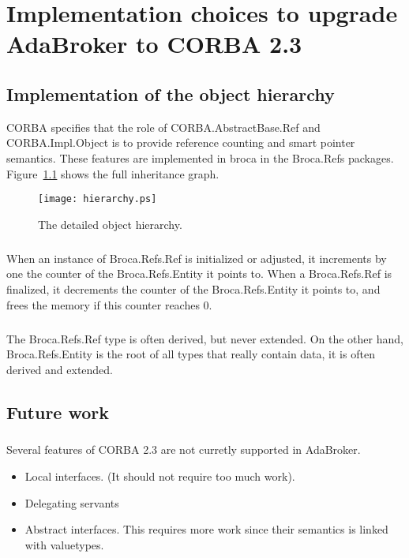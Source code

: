\chapter{Implementation choices to upgrade AdaBroker to CORBA 2.3}

\section{Implementation of the object hierarchy}
CORBA specifies that the role of CORBA.AbstractBase.Ref and
CORBA.Impl.Object is to provide reference counting and smart pointer
semantics. These features are implemented in broca in the Broca.Refs
packages. Figure~\ref{fig::detailed_hierarchy} shows the
full inheritance graph.


\vspace{2mm}
\begin{figure}[!htbp]
    \texttt{[image: hierarchy.ps]}
  \caption{The detailed object hierarchy.}
  \label{fig::detailed_hierarchy}
\end{figure}


\paragraph{}When an instance of Broca.Refs.Ref is initialized or
adjusted, it increments by one the counter of the Broca.Refs.Entity it
points to. When a Broca.Refs.Ref is finalized, it decrements the
counter of the Broca.Refs.Entity it points to, and frees the memory if
this counter reaches 0.

\paragraph{}The Broca.Refs.Ref type is often derived, but never
extended. On the other hand, \\ Broca.Refs.Entity is the root of all
types that really contain data, it is often derived and extended.




\section{Future work}

\paragraph{}Several features of CORBA 2.3 are not curretly supported
in AdaBroker.

\begin{itemize}
\item Local interfaces. (It should not require too much work).
\item Delegating servants
\item Abstract interfaces. This requires more work since their
semantics is linked with valuetypes.
\end{itemize}
